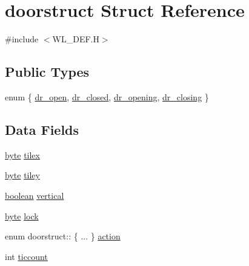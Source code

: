 \hypertarget{structdoorstruct}{
\section{doorstruct Struct Reference}
\label{structdoorstruct}
}


{\ttfamily \#include $<$WL\_\-DEF.H$>$}

\subsection*{Public Types}
\begin{DoxyCompactItemize}
\item 
enum \{ \hyperlink{structdoorstruct_aaae11d0bae6fd0cb571344b6cc4fd621a642fdb51172fa6c8a986bf5f3b9d4d22}{dr\_\-open}, 
\hyperlink{structdoorstruct_aaae11d0bae6fd0cb571344b6cc4fd621a600c45b07ead8bf7c3b2498cc5aed40a}{dr\_\-closed}, 
\hyperlink{structdoorstruct_aaae11d0bae6fd0cb571344b6cc4fd621a539706957ba025d1ce1e4414af6d7722}{dr\_\-opening}, 
\hyperlink{structdoorstruct_aaae11d0bae6fd0cb571344b6cc4fd621ace3190a9e3c7b9b0cd75f302d6a3b466}{dr\_\-closing}
 \}
\end{DoxyCompactItemize}
\subsection*{Data Fields}
\begin{DoxyCompactItemize}
\item 
\hyperlink{ID__HEAD_8H_a0c8186d9b9b7880309c27230bbb5e69d}{byte} \hyperlink{structdoorstruct_a7cbf7d1a9a3596b09d30e45f89c1d104}{tilex}
\item 
\hyperlink{ID__HEAD_8H_a0c8186d9b9b7880309c27230bbb5e69d}{byte} \hyperlink{structdoorstruct_aefb09ceda5d4ba9188ab0c51ef4bd76d}{tiley}
\item 
\hyperlink{ID__HEAD_8H_a7c6368b321bd9acd0149b030bb8275ed}{boolean} \hyperlink{structdoorstruct_a75a44cbc685156739642334bf9706666}{vertical}
\item 
\hyperlink{ID__HEAD_8H_a0c8186d9b9b7880309c27230bbb5e69d}{byte} \hyperlink{structdoorstruct_a17c9dd3fb2cbe9c4db6dd4b15ed47f38}{lock}
\item 
enum doorstruct:: \{ ... \}  \hyperlink{structdoorstruct_a5e798f42031dd553fa37a7d63ef542d4}{action}
\item 
int \hyperlink{structdoorstruct_a0b1fa6bebc4cf5eabf39c2d3606bbbaf}{ticcount}
\end{DoxyCompactItemize}


